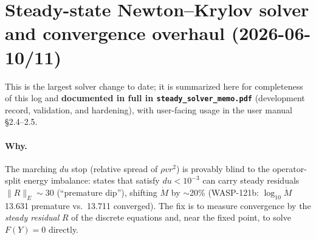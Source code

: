 \documentclass[english,a4paper]{my_memo}
\begin{document}
\section{Steady-state Newton--Krylov solver and convergence overhaul
(2026-06-10/11)}\label{sec:jfnk}

This is the largest solver change to date; it is summarized here for
completeness of this log and \textbf{documented in full in
\texttt{steady\_solver\_memo.pdf}} (development record, validation, and
hardening), with user-facing usage in the user manual \S2.4--2.5.

\paragraph{Why.} The marching $du$ stop (relative spread of $\rho v r^2$)
is provably blind to the operator-split energy imbalance: states that
satisfy $du<10^{-3}$ can carry steady residuals $\|R\|_E\sim30$
(``premature dip''), shifting $\dot M$ by $\sim$20\% (WASP-121b:
$\log_{10}\dot M$ 13.631 premature vs.\ 13.711 converged). The fix is to
measure convergence by the \emph{steady residual} $R$ of the discrete
equations and, near the fixed point, to solve $F(Y)=0$ directly.
\end{document}
